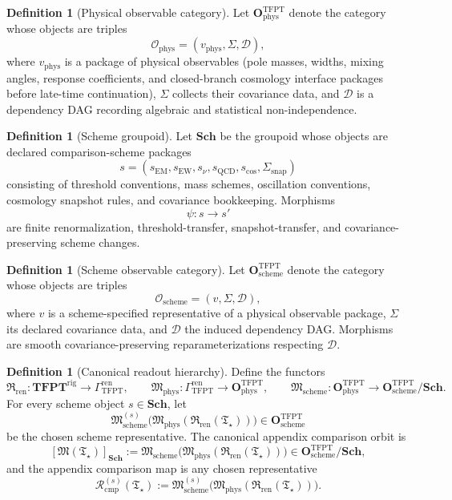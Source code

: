 \documentclass[11pt,a4paper]{article}
\theoremstyle{definition}
\newtheorem{definition}[theorem]{Definition}
\theoremstyle{remark}
\newcommand{\Tstar}{\mathfrak T_{\star}}
\newcommand{\Rcmp}{\mathcal R_{\mathrm{cmp}}}
\newcommand{\GrenTFPT}{\Gamma_{\mathrm{TFPT}}^{\mathrm{ren}}}
\newcommand{\OphysTFPT}{\mathbf O_{\mathrm{phys}}^{\mathrm{TFPT}}}
\newcommand{\OschemeTFPT}{\mathbf O_{\mathrm{scheme}}^{\mathrm{TFPT}}}
\newcommand{\SchGrp}{\mathbf{Sch}}
\newcommand{\Mop}{\mathfrak M}
\newcommand{\Mphys}{\mathfrak M_{\mathrm{phys}}}
\newcommand{\Mscheme}{\mathfrak M_{\mathrm{scheme}}}
\newcommand{\Rren}{\mathfrak R_{\mathrm{ren}}}
\begin{document}
\begin{definition}[Physical observable category]
\label{def:physical-observable-category}
Let $\OphysTFPT$ denote the category whose objects are triples
\[
\mathcal O_{\mathrm{phys}}=(v_{\mathrm{phys}},\Sigma,\mathcal D),
\]
where $v_{\mathrm{phys}}$ is a package of physical observables (pole masses, widths, mixing angles,
response coefficients, and closed-branch cosmology interface packages before late-time
continuation), $\Sigma$ collects their covariance data, and
$\mathcal D$ is a dependency DAG recording algebraic and statistical non-independence.
\end{definition}

\begin{definition}[Scheme groupoid]
\label{def:scheme-groupoid}
Let $\SchGrp$ be the groupoid whose objects are declared comparison-scheme packages
\[
s=(s_{\mathrm{EM}},s_{\mathrm{EW}},s_{\nu},s_{\mathrm{QCD}},s_{\mathrm{cos}},\Sigma_{\mathrm{snap}})
\]
consisting of threshold conventions, mass schemes, oscillation conventions, cosmology snapshot
rules, and covariance bookkeeping. Morphisms
\[
\psi:s\to s'
\]
are finite renormalization, threshold-transfer, snapshot-transfer, and covariance-preserving
scheme changes.
\end{definition}

\begin{definition}[Scheme observable category]
\label{def:obs-category}
Let $\OschemeTFPT$ denote the category whose objects are triples
\[
\mathcal O_{\mathrm{scheme}}=(v,\Sigma,\mathcal D),
\]
where $v$ is a scheme-specified representative of a physical observable package, $\Sigma$ its
declared covariance data, and $\mathcal D$ the induced dependency DAG. Morphisms are smooth
covariance-preserving reparameterizations respecting $\mathcal D$.
\end{definition}

\begin{definition}[Canonical readout hierarchy]
\label{def:canonical-measurement-orbit}
Define the functors
\[
\Rren:\mathbf{TFPT}^{\mathrm{rig}}\to\GrenTFPT,
\qquad
\Mphys:\GrenTFPT\to\OphysTFPT,
\qquad
\Mscheme:\OphysTFPT\to\OschemeTFPT/\SchGrp.
\]
For every scheme object $s\in\SchGrp$, let
\[
\Mscheme^{(s)}\bigl(\Mphys(\Rren(\Tstar))\bigr)\in\OschemeTFPT
\]
be the chosen scheme representative. The canonical appendix comparison orbit is
\[
[\Mop(\Tstar)]_{\SchGrp}
:=
\Mscheme\bigl(\Mphys(\Rren(\Tstar))\bigr)
\in \OschemeTFPT/\SchGrp,
\]
and the appendix comparison map is any chosen representative
\[
\Rcmp^{(s)}(\Tstar):=
\Mscheme^{(s)}\bigl(\Mphys(\Rren(\Tstar))\bigr).
\]
\end{definition}
\end{document}
